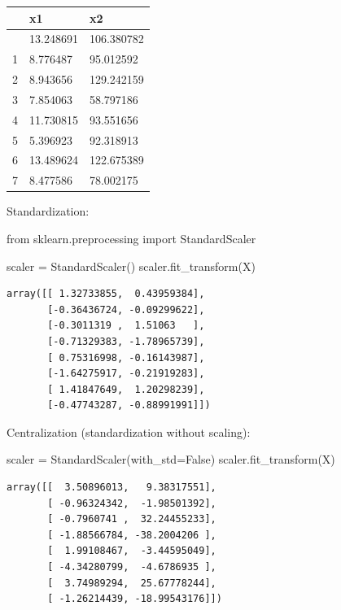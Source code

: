 \documentclass[
  letterpaper,
  DIV=11,
  numbers=noendperiod]{scrreprt}
\newenvironment{Shaded}{\begin{snugshade}}{\end{snugshade}}
\newcommand{\ImportTok}[1]{\textcolor[rgb]{0.00,0.46,0.62}{#1}}
\newcommand{\NormalTok}[1]{\textcolor[rgb]{0.00,0.23,0.31}{#1}}
\newcommand{\OperatorTok}[1]{\textcolor[rgb]{0.37,0.37,0.37}{#1}}
\newcommand{\VariableTok}[1]{\textcolor[rgb]{0.07,0.07,0.07}{#1}}
\newcounter{none} %
\theoremstyle{definition}
\theoremstyle{definition}
\theoremstyle{plain}
\theoremstyle{plain}
\theoremstyle{remark}
\begin{document}
{\def\LTcaptype{none} %
\begin{longtable}[]{@{}lll@{}}
\toprule\noalign{}
& x1 & x2 \\
\midrule\noalign{}
\endhead
\bottomrule\noalign{}
\endlastfoot
0 & 13.248691 & 106.380782 \\
1 & 8.776487 & 95.012592 \\
2 & 8.943656 & 129.242159 \\
3 & 7.854063 & 58.797186 \\
4 & 11.730815 & 93.551656 \\
5 & 5.396923 & 92.318913 \\
6 & 13.489624 & 122.675389 \\
7 & 8.477586 & 78.002175 \\
\end{longtable}
}

Standardization:

\begin{Shaded}
\begin{Highlighting}[]
\ImportTok{from}\NormalTok{ sklearn.preprocessing }\ImportTok{import}\NormalTok{ StandardScaler}

\NormalTok{scaler }\OperatorTok{=}\NormalTok{ StandardScaler()}
\NormalTok{scaler.fit\_transform(X)}
\end{Highlighting}
\end{Shaded}

\begin{verbatim}
array([[ 1.32733855,  0.43959384],
       [-0.36436724, -0.09299622],
       [-0.3011319 ,  1.51063   ],
       [-0.71329383, -1.78965739],
       [ 0.75316998, -0.16143987],
       [-1.64275917, -0.21919283],
       [ 1.41847649,  1.20298239],
       [-0.47743287, -0.88991991]])
\end{verbatim}

Centralization (standardization without scaling):

\begin{Shaded}
\begin{Highlighting}[]
\NormalTok{scaler }\OperatorTok{=}\NormalTok{ StandardScaler(with\_std}\OperatorTok{=}\VariableTok{False}\NormalTok{)}
\NormalTok{scaler.fit\_transform(X)}
\end{Highlighting}
\end{Shaded}

\begin{verbatim}
array([[  3.50896013,   9.38317551],
       [ -0.96324342,  -1.98501392],
       [ -0.7960741 ,  32.24455233],
       [ -1.88566784, -38.2004206 ],
       [  1.99108467,  -3.44595049],
       [ -4.34280799,  -4.6786935 ],
       [  3.74989294,  25.67778244],
       [ -1.26214439, -18.99543176]])
\end{verbatim}
\end{document}
